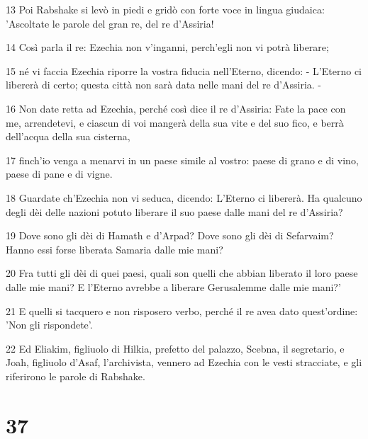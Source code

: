 \par 13 Poi Rabshake si levò in piedi e gridò con forte voce in lingua giudaica: 'Ascoltate le parole del gran re, del re d'Assiria!
\par 14 Così parla il re: Ezechia non v'inganni, perch'egli non vi potrà liberare;
\par 15 né vi faccia Ezechia riporre la vostra fiducia nell'Eterno, dicendo: - L'Eterno ci libererà di certo; questa città non sarà data nelle mani del re d'Assiria. -
\par 16 Non date retta ad Ezechia, perché così dice il re d'Assiria: Fate la pace con me, arrendetevi, e ciascun di voi mangerà della sua vite e del suo fico, e berrà dell'acqua della sua cisterna,
\par 17 finch'io venga a menarvi in un paese simile al vostro: paese di grano e di vino, paese di pane e di vigne.
\par 18 Guardate ch'Ezechia non vi seduca, dicendo: L'Eterno ci libererà. Ha qualcuno degli dèi delle nazioni potuto liberare il suo paese dalle mani del re d'Assiria?
\par 19 Dove sono gli dèi di Hamath e d'Arpad? Dove sono gli dèi di Sefarvaim? Hanno essi forse liberata Samaria dalle mie mani?
\par 20 Fra tutti gli dèi di quei paesi, quali son quelli che abbian liberato il loro paese dalle mie mani? E l'Eterno avrebbe a liberare Gerusalemme dalle mie mani?'
\par 21 E quelli si tacquero e non risposero verbo, perché il re avea dato quest'ordine: 'Non gli rispondete'.
\par 22 Ed Eliakim, figliuolo di Hilkia, prefetto del palazzo, Scebna, il segretario, e Joah, figliuolo d'Asaf, l'archivista, vennero ad Ezechia con le vesti stracciate, e gli riferirono le parole di Rabshake.

\chapter{37}

